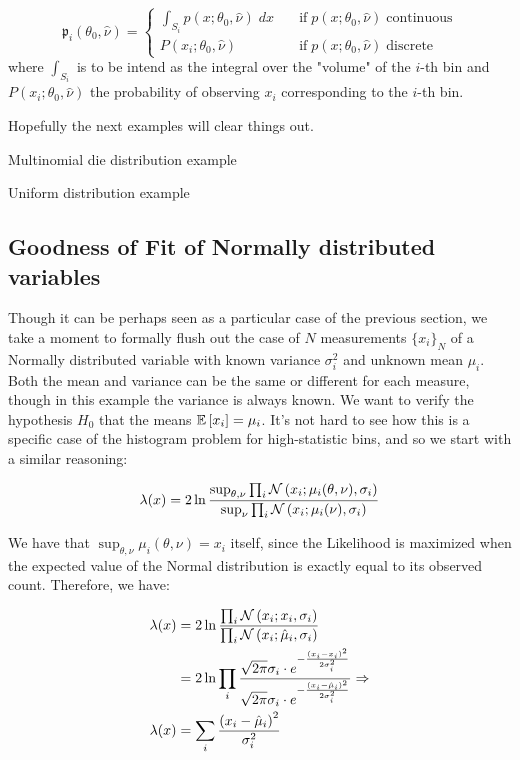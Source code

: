 \[
	\mathfrak{p}_i(\theta_0, \hat\nu)=
	\begin{cases}
		\int_{S_i}p(x;\theta_0, \hat\nu)\;dx \quad &\text{if} \; p(x;\theta_0, \hat\nu) \; \text{continuous}\\
		P(x_i;\theta_0, \hat\nu) \quad &\text{if} \; p(x;\theta_0, \hat\nu) \; \text{discrete}		
	\end{cases}
\]
where $\int_{S_i}$ is to be intend as the integral over the "volume" of the $i$-th bin and $P(x_i;\theta_0, \hat\nu)$ the probability of observing $x_i$ corresponding to the $i$-th bin.

Hopefully the next examples will clear things out.

\begin{example}
	Multinomial die distribution example
\end{example}

\begin{example}
	Uniform distribution example
\end{example}

\subsection{Goodness of Fit of Normally distributed variables}

Though it can be perhaps seen as a particular case of the previous section, we take a moment to formally flush out the case of $N$ measurements $\{x_i\}_N$ of a Normally distributed variable with known variance $\sigma_i^2$ and unknown mean $\mu_i$. Both the mean and variance can be the same or different for each measure, though in this example the variance is always known. We want to verify the hypothesis $H_0$ that the means $\mathbb{E}\left[x_i\right]=\mu_i$. It's not hard to see how this is a specific case of the histogram problem for high-statistic bins, and so we start with a similar reasoning:

	\[
	\lambda(x) = 2\ln\frac{\sup_{\theta,\nu}\prod_i\mathcal{N}\left(x_i;\mu_i(\theta,\nu),\sigma_i\right)}{\sup_\nu\prod_i\mathcal{N}\left(x_i;\mu_i(\nu),\sigma_i\right)}
	\]

We have that $\sup_{\theta,\nu}\mu_i(\theta,\nu)=x_i$ itself, since the Likelihood is maximized when the expected value of the Normal distribution is exactly equal to its observed count. Therefore, we have:

\begin{align*}
	\lambda(x) &= 2\ln\frac{\prod_i\mathcal{N}\left(x_i;x_i,\sigma_i\right)}{\prod_i\mathcal{N}\left(x_i;\hat{\mu}_i,\sigma_i\right)} \\
	&= 2\ln\prod_i \frac{\sqrt{2\pi}\sigma_i \cdot e^{-\frac{(x_i-x_i)^2}{2\sigma_i^2}}}{\sqrt{2\pi}\sigma_i \cdot e^{-\frac{(x_i-\hat{\mu}_i)^2}{2\sigma_i^2}}} \Rightarrow \\
	\lambda(x) &= \sum_i \frac{\left(x_i-\hat{\mu}_i\right)^2}{\sigma_i^2}
\end{align*}

